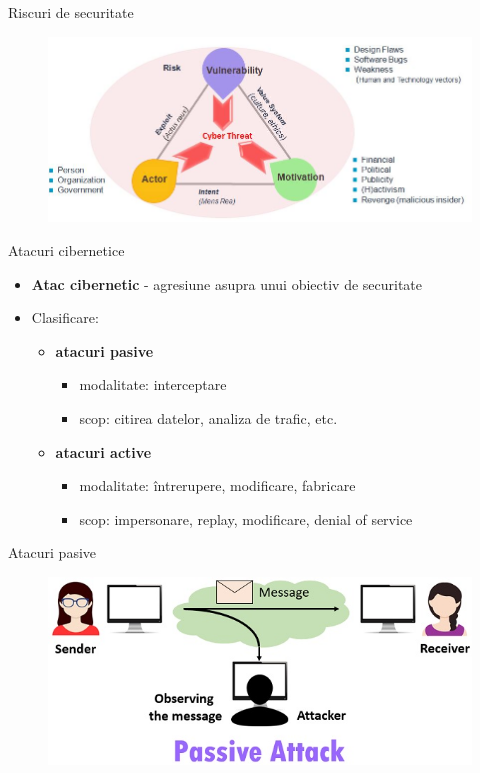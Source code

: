 \documentclass[pdf]{beamer}
\begin{document}
\begin{frame}{Riscuri de securitate}
\begin{figure}[t]
\centering
\includegraphics[scale=0.5]{Images/cybersecurity_triangle}
\end{figure}
\end{frame}



\begin{frame}{Atacuri cibernetice}
\begin{itemize}
\item
\textbf{Atac cibernetic} - agresiune asupra unui obiectiv de securitate

\item
Clasificare:

\begin{itemize}
\item
\textbf{atacuri pasive} 
\begin{itemize}
\item
modalitate: interceptare
\item
scop: citirea datelor, analiza de trafic, etc.
\end{itemize}

\item
\textbf{atacuri active} 
\begin{itemize}
\item
modalitate: întrerupere, modificare, fabricare
\item
scop: impersonare, replay, modificare, denial of service
\end{itemize}
\end{itemize}
\end{itemize}
\end{frame}



\begin{frame}{Atacuri pasive}
\begin{figure}[t]
\centering
\includegraphics[scale=0.75]{Images/passive-attack-modified}
\end{figure}
\end{frame}
\end{document}

